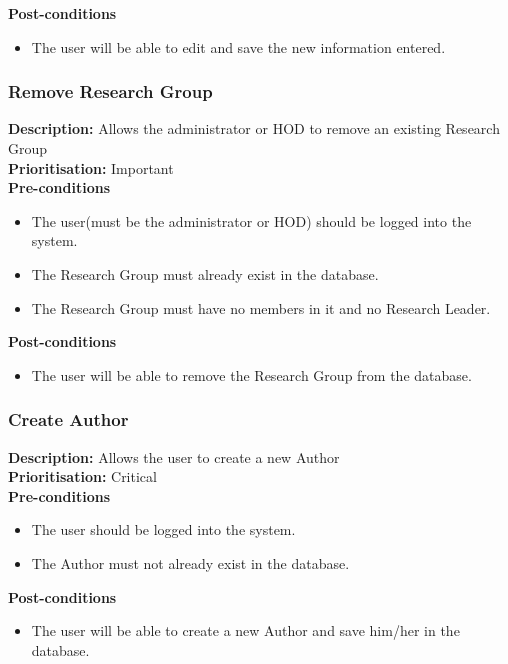 \documentclass[a4paper]{article}
\begin{document}
	\textbf{Post-conditions}
	 \begin{itemize}
		\item The user will be able to edit and save the new information entered.
	\end{itemize}
	
	\subsubsection{Remove Research Group}
	\textbf{Description:} Allows the administrator or HOD to remove an existing Research Group\\
	\textbf{Prioritisation:} Important\\
	
	\textbf{Pre-conditions}
	 \begin{itemize}
		\item The user(must be the administrator or HOD) should be logged into the system.
		\item The Research Group must already exist in the database.
		\item The Research Group must have no members in it and no Research Leader.
	\end{itemize}
	
	\textbf{Post-conditions}
	 \begin{itemize}
		\item The user will be able to remove the Research Group from the database.
	\end{itemize}
	
	\subsubsection{Create Author}
	\textbf{Description:} Allows the user to create a new Author\\
	\textbf{Prioritisation:} Critical\\
	
	\textbf{Pre-conditions}
	 \begin{itemize}
		\item The user should be logged into the system.
		\item The Author must not already exist in the database.
	\end{itemize}
	
	\textbf{Post-conditions}
	 \begin{itemize}
		\item The user will be able to create a new Author and save him/her in the database.
	\end{itemize}
	
\end{document}
